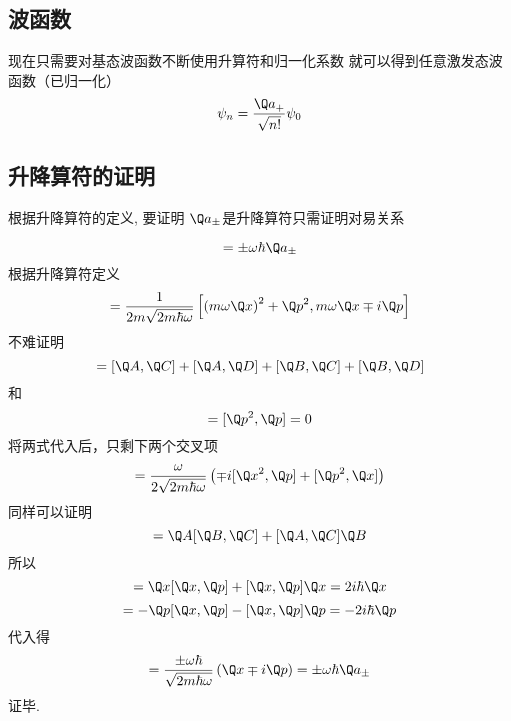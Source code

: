 \subsection{波函数}
现在只需要对基态波函数不断使用升算符和归一化系数%
就可以得到任意激发态波函数（已归一化）
\begin{equation}
{\psi_n} = \frac{{{{\Q a}_ + }}}{{\sqrt {n!} }}{\psi_0}
\end{equation}


\subsection{升降算符的证明}

根据升降算符的定义, 要证明 $\Q a_\pm$是升降算符只需证明对易关系

\begin{equation}
  [\Q H,{\Q a_ \pm }] =  \pm \omega\hbar  {\Q a_ \pm }
\end{equation}
根据升降算符定义
\begin{equation}
  [\Q H,{\Q a_ \pm }] = \frac{1}{{2m\sqrt {2m\hbar \omega } }}\left[ {{{\left( {m\omega \Q x} \right)}^2} + {{\Q p}^2},m\omega \Q x \mp i\Q p} \right]
\end{equation}
不难证明
\begin{equation}
  [\Q A + \Q B,\Q C + \Q D] = [\Q A,\Q C] + [\Q A,\Q D] + [\Q B,\Q C] + [\Q B,\Q D]
\end{equation}
和
\begin{equation}
  [{\Q x^2},\Q x] = [{\Q p^2},\Q p] = 0
\end{equation}
将两式代入后，只剩下两个交叉项
\begin{equation}
  [\Q H,{\Q a_ \pm }] = \frac{\omega }{{2\sqrt {2m\hbar \omega } }}\left( { \mp i[{{\Q x}^2},\Q p] + [{{\Q p}^2},\Q x]} \right)
\end{equation}
同样可以证明
\begin{equation}
  [\Q A\Q B,\Q C] = \Q A[\Q B,\Q C] + [\Q A,\Q C]\Q B
\end{equation}
所以
\begin{equation}
[{{\Q x}^2},\Q p] = \Q x[\Q x,\Q p] + [\Q x,\Q p]\Q x = 2i\hbar \Q x
\end{equation}
\begin{equation}
[{{\Q p}^2},\Q x] =  - \Q p[\Q x,\Q p] - [\Q x,\Q p]\Q p =  - 2i\hbar \Q p
\end{equation}
代入得
\begin{equation}
  [\Q H,{\Q a_ \pm }] = \frac{{ \pm \omega \hbar }}{{\sqrt {2m\hbar \omega } }}\left( {\Q x \mp i\Q p} \right) =  \pm \omega\hbar {\Q a_ \pm }
\end{equation}
证毕.
